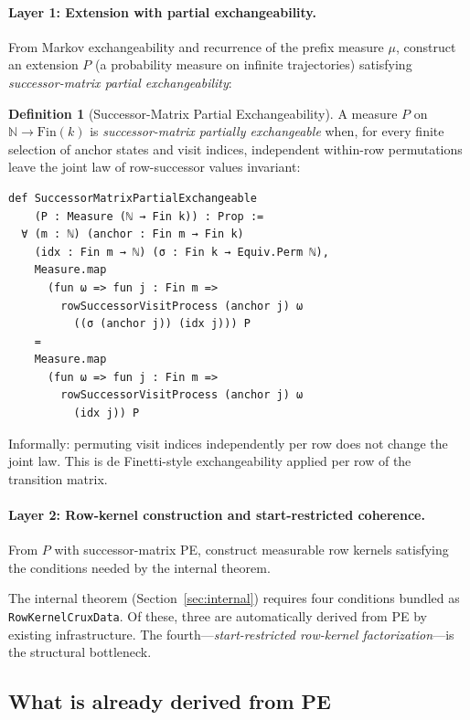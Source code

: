 \documentclass[11pt]{article}
\theoremstyle{definition}
\newtheorem{definition}[theorem]{Definition}
\newcommand{\Fin}{\mathrm{Fin}}
\newcommand{\NN}{\mathbb{N}}
\newcommand{\lean}[1]{\texttt{#1}}
\begin{document}
\paragraph{Layer 1: Extension with partial exchangeability.}
From Markov exchangeability and recurrence of the prefix measure $\mu$,
construct an extension $P$ (a probability measure on infinite trajectories)
satisfying \emph{successor-matrix partial exchangeability}:

\begin{definition}[Successor-Matrix Partial Exchangeability]
A measure $P$ on $\NN \to \Fin(k)$ is \emph{successor-matrix partially
exchangeable} when, for every finite selection of anchor states and visit
indices, independent within-row permutations leave the joint law of
row-successor values invariant:
\begin{lstlisting}
def SuccessorMatrixPartialExchangeable
    (P : Measure (ℕ → Fin k)) : Prop :=
  ∀ (m : ℕ) (anchor : Fin m → Fin k)
    (idx : Fin m → ℕ) (σ : Fin k → Equiv.Perm ℕ),
    Measure.map
      (fun ω => fun j : Fin m =>
        rowSuccessorVisitProcess (anchor j) ω
          ((σ (anchor j)) (idx j))) P
    =
    Measure.map
      (fun ω => fun j : Fin m =>
        rowSuccessorVisitProcess (anchor j) ω
          (idx j)) P
\end{lstlisting}
\end{definition}

Informally: permuting visit indices independently per row does not change
the joint law.  This is de Finetti-style exchangeability applied per row
of the transition matrix.

\paragraph{Layer 2: Row-kernel construction and start-restricted coherence.}
From $P$ with successor-matrix PE, construct measurable row kernels
satisfying the conditions needed by the internal theorem.

The internal theorem (Section~\ref{sec:internal}) requires four conditions
bundled as \lean{RowKernelCruxData}.  Of these, three are automatically
derived from PE by existing infrastructure.  The fourth---\emph{start-restricted
row-kernel factorization}---is the structural bottleneck.

\subsection{What is already derived from PE}
\end{document}
